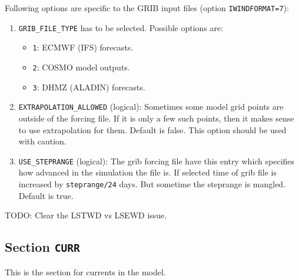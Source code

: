 \documentclass[12pt]{amsart}
\begin{document}
Following options are specific to the GRIB input files (option {\tt IWINDFORMAT=7}):
\begin{enumerate}
\item {\tt GRIB\_FILE\_TYPE} has to be selected. Possible options are:
  \begin{itemize}
  \item {\tt 1}: ECMWF (IFS) forecasts.
  \item {\tt 2}: COSMO model outputs.
  \item {\tt 3}: DHMZ (ALADIN) forecasts.
  \end{itemize}
\item {\tt EXTRAPOLATION\_ALLOWED} (logical): Sometimes some model grid points are outside of the forcing file. If it is only a few such points, then it makes sense to use extrapolation for them. Default is false. This option should be used with caution.
\item {\tt USE\_STEPRANGE} (logical): The grib forcing file have this entry which specifies how advanced in the simulation the file is. If selected time of grib file is increased by {\tt steprange/24} days. But sometime the steprange is mangled. Default is true.
\end{enumerate}

TODO: Clear the LSTWD vs LSEWD issue.





\subsection{Section {\tt CURR}}
This is the section for currents in the model.
\end{document}
